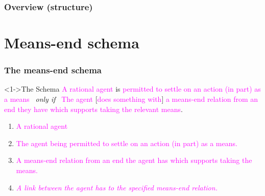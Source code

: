 \documentclass[noamssymb,
graphics,
]{beamer} %
\newcommand{\hozlinedash}[0]{
  \noindent\hdashrule[0.5ex][c]{\textwidth}{.1pt}{2.5pt}
}
\begin{document}
\begin{frame}


\end{frame}


\begin{frame}[noframenumbering]
  \frametitle{Overview (structure)}
  \tableofcontents[
  subsubsectionstyle=hide,
  ]
\end{frame}



\section{Means-end schema}
\label{sec:schema}

\begin{frame}
  \frametitle{The means-end schema}

  \begin{block}<1->{The Schema}
    \textcolor<3>{fuchsia}{A rational agent} is \textcolor<4>{fuchsia}{permitted to settle on an action (in part) as a means}
    \newline
    \mbox{ }\hfill\emph{only if}\hfill\mbox{ }
    \newline
    \textcolor<3>{fuchsia}{The agent} [\textcolor<6>{fuchsia}{does something with}] \textcolor<5>{fuchsia}{a means-end relation from an end they have which supports taking the relevant means}.
  \end{block}

  \begin{enumerate}
  \item<3-> \textcolor<3>{fuchsia}{A rational agent}
  \item<4-> \textcolor<4>{fuchsia}{The agent being permitted to settle on an action (in part) as a means.}
  \item<5-> \textcolor<5>{fuchsia}{A means-end relation from an end the agent has which supports taking the means.}
  \item<6-> \textcolor<6->{fuchsia}{\emph<7>{A link between the agent has to the specified means-end relation.}}
  \end{enumerate}
\end{frame}
\end{document}
